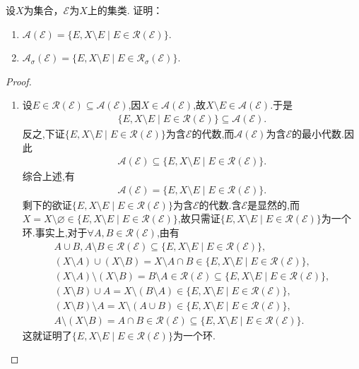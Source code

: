 \documentclass[../../main.tex]{subfiles}%
\begin{document}
\begin{proposition}\label{proposition:集合论--1.3-例题22}
设$X$为集合，$\mathscr{E}$为$X$上的集类. 证明：
\begin{enumerate}[(1)]
\item $\mathscr{A}(\mathscr{E})=\{E,X\setminus E\mid E\in\mathscr{R}(\mathscr{E})\}$.
\item $\mathscr{A}_\sigma(\mathscr{E})=\{E,X\setminus E\mid E\in\mathscr{R}_\sigma(\mathscr{E})\}$.
\end{enumerate}
\end{proposition}
\begin{proof}
\begin{enumerate}[(1)]
\item 设$E\in\mathscr{R}(\mathscr{E})\subseteq\mathscr{A}(\mathscr{E})$,因$X\in\mathscr{A}(\mathscr{E})$,故$X\setminus E\in\mathscr{A}(\mathscr{E})$.于是
\begin{align*}
\{E,X\setminus E\mid E\in\mathscr{R}(\mathscr{E})\}\subseteq\mathscr{A}(\mathscr{E}).
\end{align*}
反之,下证$\{E,X\setminus E\mid E\in\mathscr{R}(\mathscr{E})\}$为含$\mathscr{E}$的代数,而$\mathscr{A}(\mathscr{E})$为含$\mathscr{E}$的最小代数.因此
\begin{align*}
\mathscr{A}(\mathscr{E})\subseteq\{E,X\setminus E\mid E\in\mathscr{R}(\mathscr{E})\}.
\end{align*}
综合上述,有
\begin{align*}
\mathscr{A}(\mathscr{E})=\{E,X\setminus E\mid E\in\mathscr{R}(\mathscr{E})\}.
\end{align*}
剩下的欲证$\{E,X\setminus E\mid E\in\mathscr{R}(\mathscr{E})\}$为含$\mathscr{E}$的代数.含$\mathscr{E}$是显然的,而$X=X\setminus\varnothing\in\{E,X\setminus E\mid E\in\mathscr{R}(\mathscr{E})\}$,故只需证$\{E,X\setminus E\mid E\in\mathscr{R}(\mathscr{E})\}$为一个环.事实上,对于$\forall A,B\in\mathscr{R}(\mathscr{E})$,由有
\begin{gather*}
A\cup B,A\setminus B\in\mathscr{R}(\mathscr{E})\subseteq\{E,X\setminus E\mid E\in\mathscr{R}(\mathscr{E})\}, \\
(X\setminus A)\cup(X\setminus B)=X\setminus A\cap B\in\{E,X\setminus E\mid E\in\mathscr{R}(\mathscr{E})\}, \\
(X\setminus A)\setminus(X\setminus B)=B\setminus A\in\mathscr{R}(\mathscr{E})\subseteq\{E,X\setminus E\mid E\in\mathscr{R}(\mathscr{E})\}, \\
(X\setminus B)\cup A=X\setminus(B\setminus A)\in\{E,X\setminus E\mid E\in\mathscr{R}(\mathscr{E})\}, \\
(X\setminus B)\setminus A=X\setminus(A\cup B)\in\{E,X\setminus E\mid E\in\mathscr{R}(\mathscr{E})\}, \\
A\setminus(X\setminus B)=A\cap B\in\mathscr{R}(\mathscr{E})\subseteq\{E,X\setminus E\mid E\in\mathscr{R}(\mathscr{E})\}.
\end{gather*}
这就证明了$\{E,X\setminus E\mid E\in\mathscr{R}(\mathscr{E})\}$为一个环.


\end{enumerate}
\end{proof}
\end{document}
